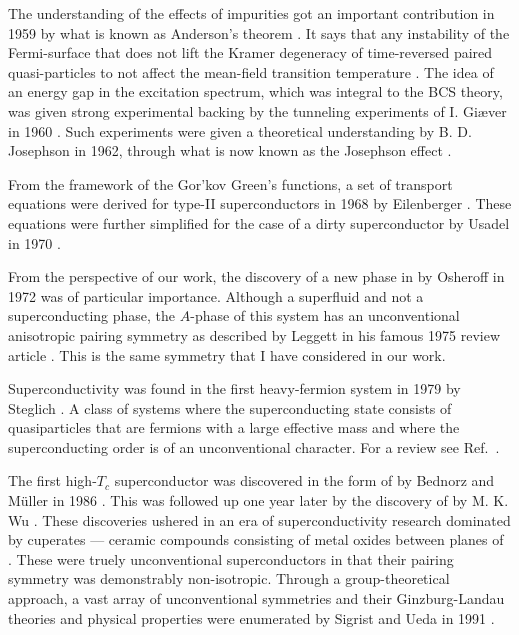 The understanding of the effects of impurities got an important contribution in 1959 by what is known as Anderson's theorem \cite{Anderson59}.
It says that any instability of the Fermi-surface that does not lift the Kramer degeneracy of time-reversed paired quasi-particles to not affect
the mean-field transition temperature \cite{Balatsky06}.
The idea of an energy gap in the excitation spectrum, which was integral to the BCS theory, was given strong experimental backing by the tunneling
experiments of I. Giæver in 1960 \cite{Giaever60}.
Such experiments were given a theoretical understanding by B. D. Josephson in 1962, through what is now known as the Josephson effect
\cite{Josephson62}.

From the framework of the Gor'kov Green's functions, a set of transport equations were derived for type-II superconductors in 1968 by
Eilenberger \cite{Eilenberger68}. These equations were further simplified for the case of a dirty superconductor by Usadel in 1970 \cite{Usadel70}.

From the perspective of our work, the discovery of a new phase in  by Osheroff \etal in 1972 was of particular importance. Although a superfluid
and not a superconducting phase, the $A$-phase of this system has an unconventional anisotropic pairing symmetry as described by Leggett in his famous
1975 review article \cite{Leggett75}. This is the same symmetry that I have considered in our work.

Superconductivity was found in the first heavy-fermion system  in 1979 by Steglich \etal \cite{Steglich79}. A class of systems where the superconducting
state consists of quasiparticles that are fermions with a large effective mass and where the superconducting order is of an
unconventional character. For a review see Ref.~\cite{White15}.

The first high-$T_c$ superconductor was discovered in the form of  by Bednorz and M\"uller in 1986 \cite{Bednorz86}.
This was followed up one
year later by the discovery of  by M. K. Wu \etal \cite{Wu87}. These discoveries ushered in an era of superconductivity
research dominated by cuperates --- ceramic compounds consisting of metal oxides between planes of . These were truely unconventional
superconductors in that their pairing symmetry was demonstrably non-isotropic. Through a group-theoretical approach, a vast array
of unconventional symmetries and their Ginzburg-Landau theories and physical properties were enumerated by Sigrist and Ueda in 1991 \cite{SigristUeda91}.

